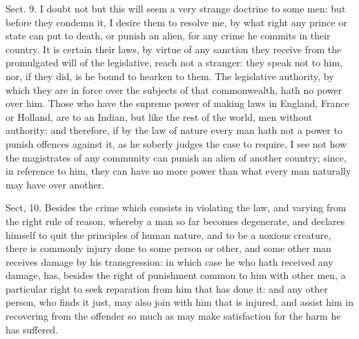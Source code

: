 \documentclass[11pt,openany]{book}
\begin{document}
Sect. 9. I doubt not but this will seem a very strange doctrine to some men: but before they condemn it, I desire them to resolve me, by what right any prince or state can put to death, or punish an alien, for any crime he commits in their country. It is certain their laws, by virtue of any sanction they receive from the promulgated will of the legislative, reach not a stranger: they speak not to him, nor, if they did, is he bound to hearken to them. The legislative authority, by which they are in force over the subjects of that commonwealth, hath no power over him. Those who have the supreme power of making laws in England, France or Holland, are to an Indian, but like the rest of the world, men without authority: and therefore, if by the law of nature every man hath not a power to punish offences against it, as he soberly judges the case to require, I see not how the magistrates of any community can punish an alien of another country; since, in reference to him, they can have no more power than what every man naturally may have over another.

Sect, 10. Besides the crime which consists in violating the law, and varying from the right rule of reason, whereby a man so far becomes degenerate, and declares himself to quit the principles of human nature, and to be a noxious creature, there is commonly injury done to some person or other, and some other man receives damage by his transgression: in which case he who hath received any damage, has, besides the right of punishment common to him with other men, a particular right to seek reparation from him that has done it: and any other person, who finds it just, may also join with him that is injured, and assist him in recovering from the offender so much as may make satisfaction for the harm he has suffered.
\end{document}
